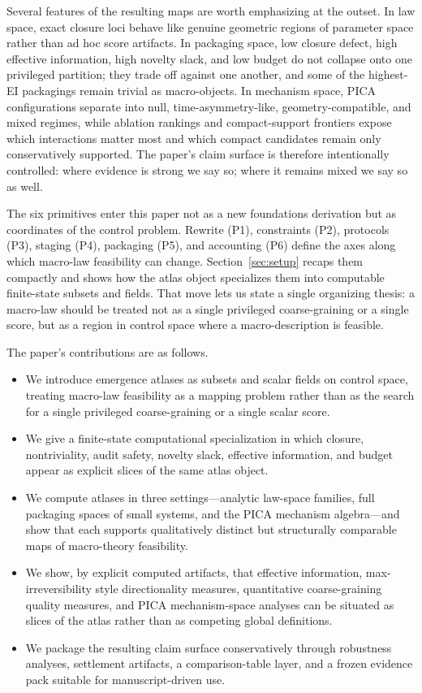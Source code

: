 \documentclass[11pt]{article}
\theoremstyle{definition}
\begin{document}
Several features of the resulting maps are worth emphasizing at the outset. In law space, exact closure loci behave like genuine geometric regions of parameter space rather than ad hoc score artifacts. In packaging space, low closure defect, high effective information, high novelty slack, and low budget do not collapse onto one privileged partition; they trade off against one another, and some of the highest-EI packagings remain trivial as macro-objects. In mechanism space, PICA configurations separate into null, time-asymmetry-like, geometry-compatible, and mixed regimes, while ablation rankings and compact-support frontiers expose which interactions matter most and which compact candidates remain only conservatively supported. The paper’s claim surface is therefore intentionally controlled: where evidence is strong we say so; where it remains mixed we say so as well.

The six primitives enter this paper not as a new foundations derivation but as coordinates of the control problem. Rewrite (P1), constraints (P2), protocols (P3), staging (P4), packaging (P5), and accounting (P6) define the axes along which macro-law feasibility can change. Section~\ref{sec:setup} recaps them compactly and shows how the atlas object specializes them into computable finite-state subsets and fields. That move lets us state a single organizing thesis: a macro-law should be treated not as a single privileged coarse-graining or a single score, but as a region in control space where a macro-description is feasible.

The paper’s contributions are as follows.
\begin{itemize}
    \item We introduce emergence atlases as subsets and scalar fields on control space, treating macro-law feasibility as a mapping problem rather than as the search for a single privileged coarse-graining or a single scalar score.
    \item We give a finite-state computational specialization in which closure, nontriviality, audit safety, novelty slack, effective information, and budget appear as explicit slices of the same atlas object.
    \item We compute atlases in three settings---analytic law-space families, full packaging spaces of small systems, and the PICA mechanism algebra---and show that each supports qualitatively distinct but structurally comparable maps of macro-theory feasibility.
    \item We show, by explicit computed artifacts, that effective information, max-irreversibility style directionality measures, quantitative coarse-graining quality measures, and PICA mechanism-space analyses can be situated as slices of the atlas rather than as competing global definitions.
    \item We package the resulting claim surface conservatively through robustness analyses, settlement artifacts, a comparison-table layer, and a frozen evidence pack suitable for manuscript-driven use.
\end{itemize}
\end{document}
